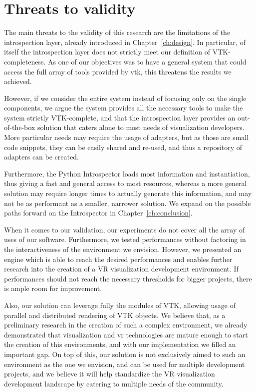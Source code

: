 \section{Threats to validity}

The main threats to the validity of this research are the limitations of the introspection layer, already introduced in Chapter~\ref{ch:design}. In particular, of itself the introspection layer does not strictly meet our definition of VTK-completeness. As one of our objectives was to have a general system that could access the full array of tools provided by \acrshort{vtk}, this threatens the results we achieved.

However, if we consider the entire system instead of focusing only on the single components, we argue the system provides all the necessary tools to make the system strictly VTK-complete, and that the introspection layer provides an out-of-the-box solution that caters alone to most needs of visualization developers. More particular needs may require the usage of adapters, but as those are small code snippets, they can be easily shared and re-used, and thus a repository of adapters can be created.

Furthermore, the Python Introspector loads most information and instantiation, thus giving a fast and general access to most resources, whereas a more general solution may require longer times to actually generate this information, and may not be as performant as a smaller, narrower solution. We expand on the possible paths forward on the Introspector in Chapter~\ref{ch:conclusion}.

When it comes to our validation, our experiments do not cover all the array of uses of our software. Furthermore, we tested performances without factoring in the interactiveness of the environment we envision. However, we presented an engine which is able to reach the desired performances and enables further research into the creation of a VR visualization development environment. If performances should not reach the necessary thresholds for bigger projects, there is ample room for improvement.

Also, our solution can leverage fully the modules of VTK, allowing usage of parallel and distributed rendering of VTK objects. We believe that, as a preliminary research in the creation of such a complex environment, we already demonstrated that visualization and \acrshort{vr} technologies are mature enough to start the creation of this environments, and with our implementation we filled an important gap. On top of this, our solution is not exclusively aimed to such an environment as the one we envision, and can be used for multiple development projects, and we believe it will help standardize the VR visualization development landscape by catering to multiple needs of the community.

